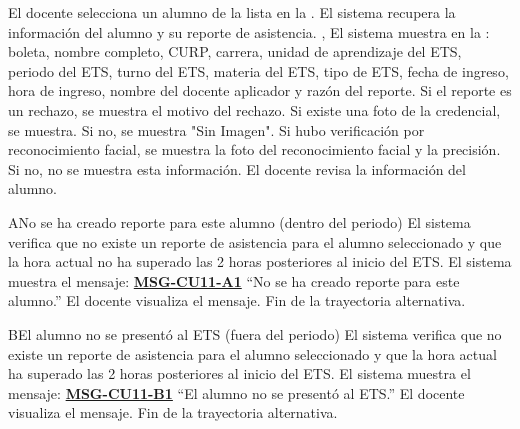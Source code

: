 \begin{UCtrayectoria}
	\UCpaso[\UCactor] El docente selecciona un alumno de la lista en la .
	\UCpaso El sistema recupera la información del alumno y su reporte de asistencia. , 
	\UCpaso El sistema muestra en la : boleta, nombre completo, CURP, carrera, unidad de aprendizaje del ETS, periodo del ETS, turno del ETS, materia del ETS, tipo de ETS, fecha de ingreso, hora de ingreso, nombre del docente aplicador y razón del reporte.
	\UCpaso Si el reporte es un rechazo, se muestra el motivo del rechazo.
	\UCpaso Si existe una foto de la credencial, se muestra. Si no, se muestra "Sin Imagen".
	\UCpaso Si hubo verificación por reconocimiento facial, se muestra la foto del reconocimiento facial y la precisión. Si no, no se muestra esta información.
	\UCpaso[\UCactor] El docente revisa la información del alumno.
\end{UCtrayectoria}

\begin{UCtrayectoriaA}{A}{No se ha creado reporte para este alumno (dentro del periodo)}
	\UCpaso El sistema verifica que no existe un reporte de asistencia para el alumno seleccionado y que la hora actual no ha superado las 2 horas posteriores al inicio del ETS.
	\UCpaso El sistema muestra el mensaje: \textbf{\hyperref[msg:CU11-A1]{MSG-CU11-A1}} ``No se ha creado reporte para este alumno.''
	\UCpaso[\UCactor] El docente visualiza el mensaje.
	\UCpaso Fin de la trayectoria alternativa.
\end{UCtrayectoriaA}

\begin{UCtrayectoriaA}{B}{El alumno no se presentó al ETS (fuera del periodo)}
	\UCpaso El sistema verifica que no existe un reporte de asistencia para el alumno seleccionado y que la hora actual ha superado las 2 horas posteriores al inicio del ETS.
	\UCpaso El sistema muestra el mensaje: \textbf{\hyperref[msg:CU11-B1]{MSG-CU11-B1}} ``El alumno no se presentó al ETS.''
	\UCpaso[\UCactor] El docente visualiza el mensaje.
	\UCpaso Fin de la trayectoria alternativa.
\end{UCtrayectoriaA}




